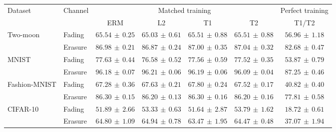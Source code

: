 \begin{tabular*}{\linewidth}{@{\extracolsep{\fill}}llccccc@{}}
\toprule
\multirow{2}{*}{Dataset} & \multirow{2}{*}{Channel} & \multicolumn{4}{c}{Matched training} & Perfect training \\
\cmidrule(lr){3-6}\cmidrule(l){7-7}
 & & ERM & L2 & T1 & T2 & T1/T2 \\
\midrule
\multirow{2}{*}{Two-moon} & Fading & $\mathbf{65.54}\,\pm\,0.25$ & $65.03\,\pm\,0.61$ & $65.51\,\pm\,0.88$ & $65.51\,\pm\,0.88$ & $56.96\,\pm\,1.18$ \\
 & Erasure & $86.98\,\pm\,0.21$ & $86.87\,\pm\,0.24$ & $87.00\,\pm\,0.35$ & $\mathbf{87.04}\,\pm\,0.32$ & $82.68\,\pm\,0.47$ \\
\midrule[0.25pt]
\multirow{2}{*}{MNIST} & Fading & $\mathbf{77.63}\,\pm\,0.44$ & $76.58\,\pm\,0.52$ & $77.56\,\pm\,0.59$ & $77.52\,\pm\,0.35$ & $53.87\,\pm\,0.79$ \\
 & Erasure & $96.18\,\pm\,0.07$ & $\mathbf{96.21}\,\pm\,0.06$ & $96.19\,\pm\,0.06$ & $96.09\,\pm\,0.04$ & $87.25\,\pm\,0.46$ \\
\midrule[0.25pt]
\multirow{2}{*}{Fashion-MNIST} & Fading & $67.28\,\pm\,0.36$ & $67.63\,\pm\,0.21$ & $\mathbf{67.80}\,\pm\,0.24$ & $67.52\,\pm\,0.17$ & $40.82\,\pm\,0.40$ \\
 & Erasure & $\mathbf{86.30}\,\pm\,0.15$ & $86.20\,\pm\,0.13$ & $86.30\,\pm\,0.16$ & $86.20\,\pm\,0.16$ & $77.81\,\pm\,0.58$ \\
\midrule[0.25pt]
\multirow{2}{*}{CIFAR-10} & Fading & $51.89\,\pm\,2.66$ & $53.33\,\pm\,0.63$ & $51.64\,\pm\,2.87$ & $\mathbf{53.79}\,\pm\,1.62$ & $18.72\,\pm\,0.61$ \\
 & Erasure & $64.80\,\pm\,1.09$ & $\mathbf{64.94}\,\pm\,0.78$ & $63.47\,\pm\,1.95$ & $64.47\,\pm\,0.48$ & $37.07\,\pm\,1.94$ \\
\bottomrule
\end{tabular*}
